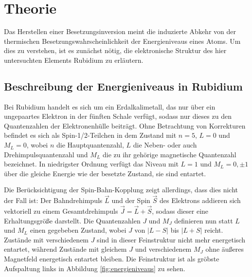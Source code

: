 \section{Theorie}
\label{sec:Theorie}
  Das Herstellen einer Besetzungsinversion meint die induzierte Abkehr von der thermischen Besetzungswahrscheinlichkeit der Energieniveaus eines Atoms.
  Um dies zu verstehen, ist es zunächst nötig, die elektronische Struktur des hier untersuchten Elements Rubidium zu erläutern.

  \subsection{Beschreibung der Energieniveaus in Rubidium}
  \label{subsec:energieniveaus}
  Bei Rubidium handelt es sich um ein Erdalkalimetall, das nur über ein ungepaartes Elektron in der fünften Schale verfügt, sodass nur dieses zu den Quantenzahlen der Elektronenhülle beiträgt.
  Ohne Betrachtung von Korrekturen befindet es sich als Spin-1/2-Teilchen in dem Zustand mit $n=5$, $L=0$ und $M_L=0$, wobei $n$ die Hauptquantenzahl, $L$ die Neben- oder auch Drehimpulsquantenzahl und $M_L$ die zu ihr gehörige magnetische Quantenzahl bezeichnet. In niedrigster Ordnung verfügt das Niveau mit $L=1$ und $M_L=0,\pm1$ über die gleiche Energie wie der besetzte Zustand, sie sind entartet.

  Die Berücksichtigung der Spin-Bahn-Kopplung zeigt allerdings, dass dies nicht der Fall ist: Der Bahndrehimpuls $\vec{L}$ und der Spin $\vec{S}$ des Elektrons addieren sich vektoriell zu einem Gesamtdrehimpuls $\vec{J}=\vec{L}+\vec{S}$, sodass dieser eine Erhaltungsgröße darstellt. Die Quantenzahlen $J$ und $M_J$ definieren nun statt $L$ und $M_L$ einen gegebeben Zustand, wobei $J$ von $\lvert L - S \rvert$ bis $\lvert L + S \rvert$ reicht. Zustände mit verschiedenem $J$ sind in dieser Feinstruktur nicht mehr energetisch entartet, während Zustände mit gleichem $J$ und verschiedenem $M_J$ ohne äußeres Magnetfeld energetisch entartet bleiben.
  Die Feinstruktur ist als gröbste Aufspaltung links in Abbildung \ref{fig:energieniveaus} zu sehen.

